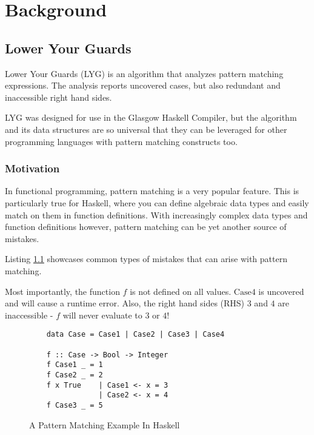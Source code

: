 \chapter{Background}\label{sec:background}

\section{Lower Your Guards}

Lower Your Guards (LYG) is an algorithm that analyzes pattern matching expressions.
The analysis reports uncovered cases, but also redundant and inaccessible right hand sides.

LYG was designed for use in the Glasgow Haskell Compiler,
but the algorithm and its data structures are so universal
that they can be leveraged for other programming languages with pattern matching constructs too.


\subsection{Motivation}

In functional programming, pattern matching is a very popular feature.
This is particularly true for Haskell, where you can define algebraic data types
and easily match on them in function definitions.
With increasingly complex data types and function definitions however,
pattern matching can be yet another source of mistakes.

Listing \ref{lst:haskell} showcases common types of mistakes that can arise with pattern matching.

Most importantly, the function $f$ is not defined on all values.
$\mathrm{Case4}$ is uncovered and will cause a runtime error.
Also, the right hand sides (RHS) $3$ and $4$ are inaccessible - $f$ will never evaluate to $3$ or $4$!

\begin{figure}[htbp]
	\caption{A Pattern Matching Example In Haskell}
	\label{lst:haskell}
    \begin{verbatim}
    data Case = Case1 | Case2 | Case3 | Case4
    
    f :: Case -> Bool -> Integer
    f Case1 _ = 1
    f Case2 _ = 2
    f x True    | Case1 <- x = 3
                | Case2 <- x = 4
    f Case3 _ = 5
    \end{verbatim}
\end{figure}

